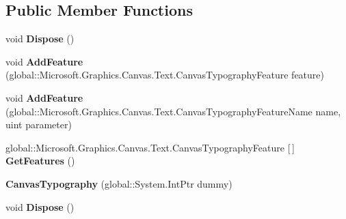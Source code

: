 \subsection*{Public Member Functions}
\begin{DoxyCompactItemize}
\item 
\mbox{\label{class_microsoft_1_1_graphics_1_1_canvas_1_1_text_1_1_canvas_typography_a1797ea53a1672e4abdf3ca14d7a3d8da}} 
void {\bfseries Dispose} ()
\item 
\mbox{\label{class_microsoft_1_1_graphics_1_1_canvas_1_1_text_1_1_canvas_typography_adb24235074d7ba03317c093ee442f78d}} 
void {\bfseries Add\+Feature} (global\+::\+Microsoft.\+Graphics.\+Canvas.\+Text.\+Canvas\+Typography\+Feature feature)
\item 
\mbox{\label{class_microsoft_1_1_graphics_1_1_canvas_1_1_text_1_1_canvas_typography_ad4ae4dcdbdf7c24abf69746742cc3d0c}} 
void {\bfseries Add\+Feature} (global\+::\+Microsoft.\+Graphics.\+Canvas.\+Text.\+Canvas\+Typography\+Feature\+Name name, uint parameter)
\item 
\mbox{\label{class_microsoft_1_1_graphics_1_1_canvas_1_1_text_1_1_canvas_typography_a91ad523c9e09574205511271e56e706b}} 
global\+::\+Microsoft.\+Graphics.\+Canvas.\+Text.\+Canvas\+Typography\+Feature \mbox{[}$\,$\mbox{]} {\bfseries Get\+Features} ()
\item 
\mbox{\label{class_microsoft_1_1_graphics_1_1_canvas_1_1_text_1_1_canvas_typography_acfaa49a5331916c8f6730fa502fc9485}} 
{\bfseries Canvas\+Typography} (global\+::\+System.\+Int\+Ptr dummy)
\item 
\mbox{\label{class_microsoft_1_1_graphics_1_1_canvas_1_1_text_1_1_canvas_typography_a1797ea53a1672e4abdf3ca14d7a3d8da}} 
void {\bfseries Dispose} ()
\item 
\mbox{\label{class_microsoft_1_1_graphics_1_1_canvas_1_1_text_1_1_canvas_typography_adb24235074d7ba03317c093ee442f78d}} 

\end{DoxyCompactItemize}
